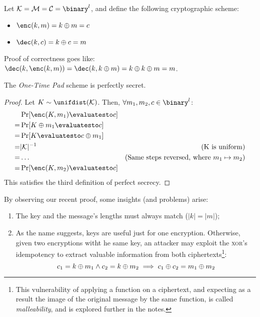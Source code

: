 Let $\K = \M = \C = \binary^l$, and define the following cryptographic scheme:
\begin{itemize}
    \item $\enc(k, m) = k \xor m = c$
    \item $\dec(k, c) = k \xor c = m$
\end{itemize}

Proof of correctness goes like: $\dec(k, \enc(k, m)) = \dec(k, k \xor m) = k \xor k \xor m = m$.

\begin{theorem}
    The \emph{One-Time Pad} scheme is perfectly secret.
\end{theorem}
\begin{proof}
    Let $K \sim \unifdist(\K)$. Then, $\forall m_1, m_2, c \in \binary^l$:
    \begin{align*}
        & \Pr[\enc(K, m_1) \evaluatesto c] & \\
        =& \Pr[K \xor m_1 \evaluatesto c] & \\
        =& \Pr[K \evaluatesto c \xor m_1] & \\
        =& |\K|^{-1} & \text{(K is uniform)} \\
        =& \dots & \text{(Same steps reversed, where $m_1 \mapsto m_2$)} \\
        =& \Pr[\enc(K, m_2) \evaluatesto c] &  
    \end{align*}
    This satisfies the third definition of perfect secrecy.
\end{proof}


By observing our recent proof, some insights (and problems) arise:
\begin{enumerate}
    \item The key and the message's lengths must always match ($|k| = |m|$);
    \item As the name suggests, keys are useful just for one encryption. Otherwise, given two encryptions witht he same key, an attacker may exploit the \textsc{xor}'s idempotency to extract valuable information from both ciphertexts\footnote{This vulnerability of applying a function on a ciphertext, and expecting as a result the image of the original message by the same function, is called \emph{malleability}, and is explored further in the notes.}:
    \[
        c_1 = k \oplus m_1 \wedge c_2 = k \oplus m_2 \implies c_1 \oplus c_2 = m_1 \oplus m_2
    \]
    
\end{enumerate}

